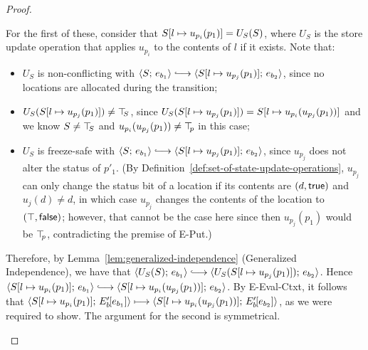 \begin{proof}
\begin{enumerate}
\begin{enumerate}
\begin{itemize}
\begin{itemize}
            For the first of these, consider that
            $S[l \mapsto u_{p_i}(p_1)] = U_S(S)$, where $U_S$ is the
            store update operation that applies $u_{p_i}$ to the
            contents of $l$ if it exists.  Note that:
            \begin{itemize}
            \item $U_S$ is non-conflicting with $\config{S}{e_{b_1}}
              \parstepsto
              \config{\extSRaw{S}{l}{u_{p_j}(p_1)}}{e_{b_2}}$, since no
              locations are allocated during the transition;
            \item $U_S(S[l \mapsto u_{p_j}(p_1)]) \neq \top\hspace{-0.85mm}_{S}$, since
              $U_S(S[l \mapsto u_{p_j}(p_1)]) =
              S[l \mapsto u_{p_i}(u_{p_j}(p_1))]$ and we know $S \neq
              \top\hspace{-0.85mm}_{S}$ and $u_{p_i}(u_{p_j}(p_1)) \neq \top\hspace{-0.85mm}_{p}$ in this
              case;
            \item $U_S$ is freeze-safe with $\config{S}{e_{b_1}}
              \parstepsto
              \config{\extSRaw{S}{l}{u_{p_j}(p_1)}}{e_{b_2}}$, since
              $u_{p_j}$ does not alter the status of $p'_1$.  (By
              Definition~\ref{def:set-of-state-update-operations},
              $u_{p_j}$ can only change the status bit of a location if
              its contents are $(d, \textsf{true})$ and $u_j(d) \neq
              d$, in which case $u_{p_j}$ changes the contents of the
              location to $(\top, \textsf{false})$; however, that
              cannot be the case here since then $u_{p_j}(p_1)$ would be
              $\top\hspace{-0.85mm}_{p}$, contradicting the premise of {\sc E-Put}.)
            \end{itemize}

            Therefore, by Lemma~\ref{lem:generalized-independence}
            (Generalized Independence), we have that
            $\config{U_S(S)}{e_{b_1}} \parstepsto
            \config{U_S(\extSRaw{S}{l}{u_{p_j}(p_1)})}{e_{b_2}}$.
            Hence $\config{\extSRaw{S}{l}{u_{p_i}(p_1)}}{e_{b_1}}
            \parstepsto
            \config{\extSRaw{S}{l}{u_{p_i}(u_{p_j}(p_1))}}{e_{b_2}}$.
            By {\sc E-Eval-Ctxt}, it follows that
            $\langle S[l \mapsto u_{p_i}(p_1)];\, E'_b\hspace{-1mm}\left[e_{b_1}\right] \rangle
            \longmapsto
            \langle S[l \mapsto u_{p_i}(u_{p_j}(p_1))];\, E'_b\hspace{-1mm}\left[e_{b_2}\right] \rangle$,
            as we were required to show.  The argument for the second
            is symmetrical.

          \end{itemize}


\end{itemize}
\end{enumerate}
\end{enumerate}
\end{proof}
